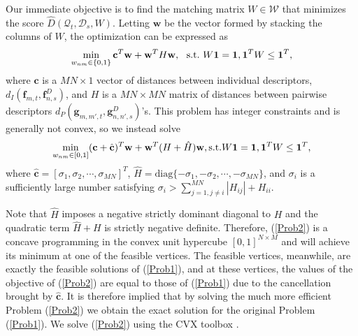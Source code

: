 Our immediate objective is to find the matching matrix $W\in\mathcal{W}$ that minimizes the score $\hat{D}(\mathcal{Q}_{t}, \mathcal{D}_{s}, W)$. Letting $\mathbf{w}$ be the vector formed by stacking the columns of $W$, the optimization can be expressed as
\begin{equation*}
\label{Prob1}
\min_{w_{nm}\in\{0,1\}}\mathbf{c}^{T}\mathbf{w}+\mathbf{w}^{T}H\mathbf{w},\ \ \textup{s.t.}\ W\mathbf{1}=\mathbf{1}, \mathbf{1}^{T}W\leq\mathbf{1}^{T},
\end{equation*}
where $\mathbf{c}$ is a $MN\times 1$ vector of distances between individual descriptors, $d_{I}(\mathbf{f}_{m,t}, \mathbf{f}^{D}_{n,s})$, and $H$ is a $MN\times MN$ matrix of distances between pairwise descriptors $d_{P}(\mathbf{g}_{m,m',t}, \mathbf{g}^{D}_{n,n',s})$'s. This problem has integer constraints and is generally not convex, so we instead solve
\begin{equation}
\label{Prob2}
\min_{w_{nm}\in[0,1]}(\mathbf{c}+\hat{\mathbf{c}})^{T}\mathbf{w}+\mathbf{w}^{T}(H+\hat{H})\mathbf{w}, \textup{s.t.} W\mathbf{1}=\mathbf{1}, \mathbf{1}^{T}W\leq\mathbf{1}^{T},
\end{equation}
where $\hat{\mathbf{c}}=[\sigma_{1},\sigma_{2},\cdots,\sigma_{MN}]^{T}$, $\hat{H}=\text{diag}\{-\sigma_{1},-\sigma_{2},\cdots,-\sigma_{MN}\}$, and $\sigma_{i}$ is a sufficiently large number satisfying $\sigma_{i}>\sum^{MN}_{j=1,j\neq i}|H_{ij}|+H_{ii}$. 

Note that $\hat{H}$ imposes a negative strictly dominant diagonal to $H$ and the quadratic term $\hat{H}+H$ is strictly negative definite. Therefore, (\ref{Prob2}) is a concave programming in the convex unit hypercube $[0,1]^{N\times M}$ and will achieve its minimum at one of the feasible vertices. The feasible vertices, meanwhile, are exactly the feasible solutions of (\ref{Prob1}), and at these vertices, the values of the objective of (\ref{Prob2}) are equal to those of (\ref{Prob1}) due to the cancellation brought by $\hat{\mathbf{c}}$. It is therefore implied that by solving the much more efficient Problem (\ref{Prob2}) we obtain the exact solution for the original Problem (\ref{Prob1}). We solve (\ref{Prob2}) using the CVX toolbox \cite{cvx}.

